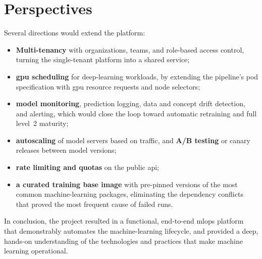 \section*{Perspectives}
Several directions would extend the platform:
\begin{itemize}[leftmargin=1.4em]
  \item \textbf{Multi-tenancy} with organizations, teams, and role-based access
        control, turning the single-tenant platform into a shared service;
  \item \textbf{\gls{gpu} scheduling} for deep-learning workloads, by extending
        the pipeline's pod specification with \gls{gpu} resource requests and
        node selectors;
  \item \textbf{model monitoring}, prediction logging, data and concept drift
        detection, and alerting, which would close the loop toward automatic
        retraining and full level~2 maturity;
  \item \textbf{autoscaling} of model servers based on traffic, and
        \textbf{A/B testing} or canary releases between model versions;
  \item \textbf{rate limiting and quotas} on the public \gls{api};
  \item \textbf{a curated training base image} with pre-pinned versions of the
        most common machine-learning packages, eliminating the dependency
        conflicts that proved the most frequent cause of failed runs.
\end{itemize}

In conclusion, the project resulted in a functional, end-to-end \gls{mlops}
platform that demonstrably automates the machine-learning lifecycle, and provided a
deep, hands-on understanding of the technologies and practices that make machine
learning operational.
